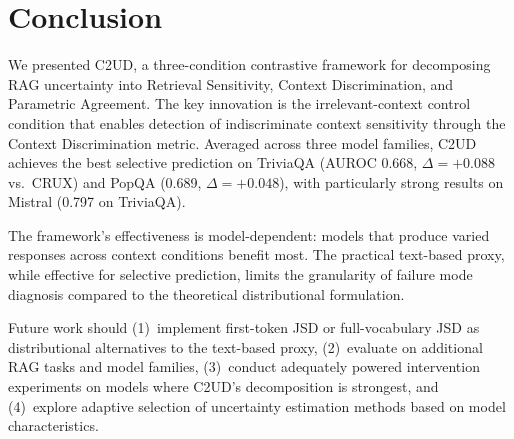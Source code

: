 \documentclass{article}
\newcommand{\ours}{\textsc{C2UD}}
\begin{document}
\section{Conclusion}
\label{sec:conclusion}

We presented \ours{}, a three-condition contrastive framework for decomposing RAG uncertainty into Retrieval Sensitivity, Context Discrimination, and Parametric Agreement.
The key innovation is the irrelevant-context control condition that enables detection of indiscriminate context sensitivity through the Context Discrimination metric.
Averaged across three model families, \ours{} achieves the best selective prediction on TriviaQA (AUROC 0.668, $\Delta = +0.088$ vs.\ CRUX) and PopQA (0.689, $\Delta = +0.048$), with particularly strong results on Mistral (0.797 on TriviaQA).

The framework's effectiveness is model-dependent: models that produce varied responses across context conditions benefit most.
The practical text-based proxy, while effective for selective prediction, limits the granularity of failure mode diagnosis compared to the theoretical distributional formulation.

Future work should (1)~implement first-token JSD or full-vocabulary JSD as distributional alternatives to the text-based proxy, (2)~evaluate on additional RAG tasks and model families, (3)~conduct adequately powered intervention experiments on models where \ours{}'s decomposition is strongest, and (4)~explore adaptive selection of uncertainty estimation methods based on model characteristics.


\end{document}
